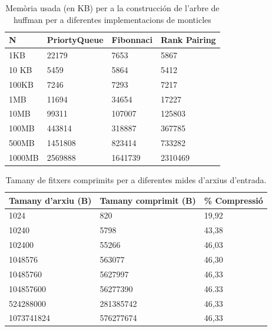 \documentclass{ieeetj}
\begin{document}
\begin{table}[H]
    \centering
    \begin{tabular}{|l|l|l|l|}
        \hline
        \textbf {N} & \textbf{PriortyQueue} & \textbf{Fibonnaci } & \textbf{Rank Pairing } \\
        \hline
         1KB	 &22179	&7653	&5867\\
        10 KB	&5459	&5864	&5412\\
        100KB	&7246	&7293	&7217\\
        1MB	    &11694	&34654&	17227\\
        10MB	&99311&	107007	&125803\\
        100MB	&443814&	318887&	367785\\
        500MB	&1451808&	823414	&733282\\
        1000MB	&2569888	&1641739&	2310469\\
                \hline
    \end{tabular}
    \vspace{3mm}
    \caption{Memòria usada (en KB) per a la construcción de l'arbre de huffman per a diferentes implementacions de monticles}
\end{table}

\begin{table}[H]
    \centering
    \begin{tabular}{|l|l|l|}
        \hline
        \textbf {Tamany d'arxiu (B)} & \textbf{Tamany comprimit (B)} & \textbf{\% Compressió} \\
        \hline
        1024       &	 820  &  19,92\\
        10240      &	5798 &   43,38\\
        102400     &	55266 & 46,03\\
        1048576    &	563077 & 46,30\\
        10485760   &	5627997 & 46,33\\
        104857600  &	56277390 & 46.33\\
        524288000  &	281385742 &  46,33\\
        1073741824 &	576277674 &  46,33\\
        \hline
    \end{tabular}
    \vspace{3mm}
    \caption{Tamany de fitxers comprimits per a diferentes mides d'arxius d'entrada.}
\end{table}
\end{document}
